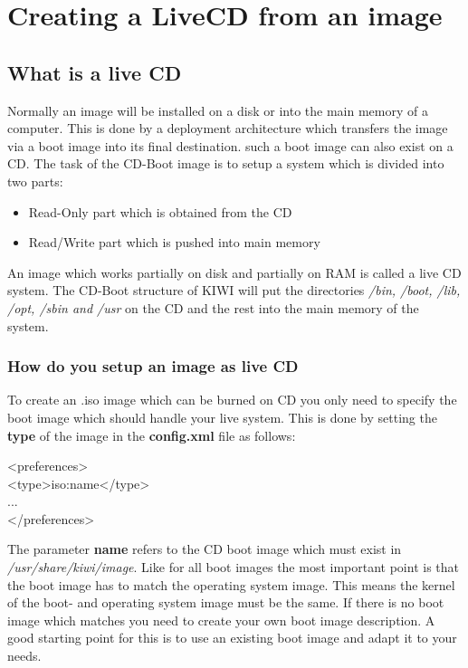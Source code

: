 \chapter{Creating a LiveCD from an image}
\label{chapter:cdboot}
\minitoc

\section{What is a live CD}
Normally an image will be installed on a disk or into the
main memory of a computer. This is done by a deployment
architecture which transfers the image via a boot image
into its final destination. such a boot image can also
exist on a CD. The task of the CD-Boot image is to setup
a system which is divided into two parts:

\begin{itemize}
	\item Read-Only part which is obtained from the CD
	\item Read/Write part which is pushed into main memory
\end{itemize}

An image which works partially on disk and partially on RAM
is called a live CD system. The CD-Boot structure of KIWI will
put the directories \textit{/bin, /boot, /lib, /opt, /sbin and /usr}
on the CD and the rest into the main memory of the system.

\subsection{How do you setup an image as live CD}
To create an .iso image which can be burned on CD you only need
to specify the boot image which should handle your live system.
This is done by setting the \textbf{type} of the image in the
\textbf{config.xml} file as follows:

\begin{Command}{9cm}
<preferences>\\
\hspace*{1cm}<type>iso:name</type>\\
\hspace*{1cm}...\\
</preferences>
\end{Command}

The parameter \textbf{name} refers to the CD boot image which
must exist in \textit{/usr/share/kiwi/image}. Like for all boot
images the most important point is that the boot image has to
match the operating system image. This means the kernel of the boot-
and operating system image must be the same. If there is no
boot image which matches you need to create your own boot image
description. A good starting point for this is to use an existing
boot image and adapt it to your needs.

